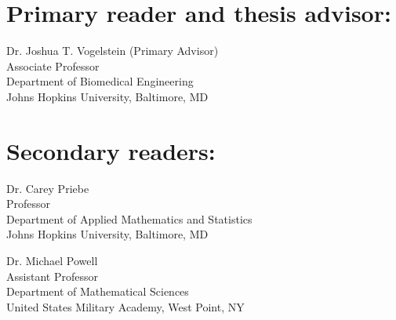 \begin{singlespace}

\section*{Primary reader and thesis advisor:}

Dr. Joshua T. Vogelstein (Primary Advisor)\\
Associate Professor \\
Department of Biomedical Engineering\\
Johns Hopkins University, Baltimore, MD 


\section*{Secondary readers:}

Dr. Carey Priebe \\
Professor \\
Department of Applied Mathematics and Statistics\\
Johns Hopkins University, Baltimore, MD 

\vspace{0.1in}

Dr. Michael Powell \\
Assistant Professor \\
Department of Mathematical Sciences\\
United States Military Academy, West Point, NY


\end{singlespace}